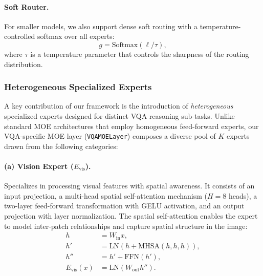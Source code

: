 \paragraph{Soft Router.} For smaller models, we also support dense soft routing with a temperature-controlled softmax over all experts:
\begin{equation}
    g = \text{Softmax}(\ell / \tau),
\end{equation}
where $\tau$ is a temperature parameter that controls the sharpness of the routing distribution.

\subsubsection{Heterogeneous Specialized Experts}
\label{sec:method:fusion:experts}

A key contribution of our framework is the introduction of \textit{heterogeneous} specialized experts designed for distinct VQA reasoning sub-tasks. Unlike standard MOE architectures that employ homogeneous feed-forward experts, our VQA-specific MOE layer (\texttt{VQAMOELayer}) composes a diverse pool of $K$ experts drawn from the following categories:

\paragraph{(a) Vision Expert ($E_{\text{vis}}$).}
Specializes in processing visual features with spatial awareness. It consists of an input projection, a multi-head spatial self-attention mechanism ($H = 8$ heads), a two-layer feed-forward transformation with GELU activation, and an output projection with layer normalization. The spatial self-attention enables the expert to model inter-patch relationships and capture spatial structure in the image:
\begin{align}
    h &= W_{\text{in}} x, \\
    h' &= \text{LN}\!\left(h + \text{MHSA}(h, h, h)\right), \\
    h'' &= h' + \text{FFN}(h'), \\
    E_{\text{vis}}(x) &= \text{LN}\!\left(W_{\text{out}} h''\right).
\end{align}

